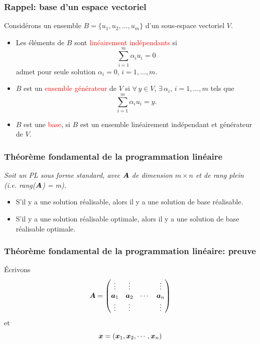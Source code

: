 \documentclass[usepdftitle=false]{beamer}
\begin{document}
\begin{frame}
\frametitle{Rappel: base d'un espace vectoriel}

Considérons un ensemble $B = \lbrace u_1, u_2,\ldots, u_m \rbrace$ d'un sous-espace vectoriel $V$.

\begin{itemize}
\item 
Les éléments de $B$ sont \textcolor{red}{linéairement indépendants} si
$$
\sum_{i=1}^m \alpha_i u_i = 0
$$
admet pour seule solution $\alpha_i = 0$, $i = 1,\ldots,m$.
\item
$B$ est un \textcolor{red}{ensemble générateur} de $V$ si $\forall\, y \in V$, $\exists\, \alpha_i$, $i = 1,\ldots,m$ tels que
$$
\sum_{i=1}^m \alpha_i u_i = y.
$$
\item
$B$ est une \textcolor{red}{base}, si $B$ est un ensemble linéairement indépendant et générateur
de $V$.
\end{itemize}

\end{frame}

\begin{frame}
\frametitle{Théorème fondamental de la programmation linéaire}

{\it
Soit un PL sous forme standard, avec ${\boldsymbol{A}}$ de dimension $m \times n$ et de rang plein (i.e. rang(${\boldsymbol{A}}$) = m).
\begin{itemize}
\item
S'il y a une solution réalisable, alors il y a une solution de base réalisable.
\item
S'il y a une solution réalisable optimale, alors il y a une solution de base réalisable optimale.
\end{itemize}
}

\end{frame}

\begin{frame}
\frametitle{Théorème fondamental de la programmation linéaire: preuve}

Écrivons
\[
{\boldsymbol{A}} =
\begin{pmatrix}
\vdots & \vdots & & \vdots \\
{\boldsymbol{a}}_1 & {\boldsymbol{a}}_2 & \cdots & {\boldsymbol{a}}_n \\
\vdots & \vdots & & \vdots
\end{pmatrix}
\]
et
\[
{\boldsymbol{x}} = ( {\boldsymbol{x}}_1, {\boldsymbol{x}}_2, \cdots, {\boldsymbol{x}}_n )
\]
\end{frame}
\end{document}
